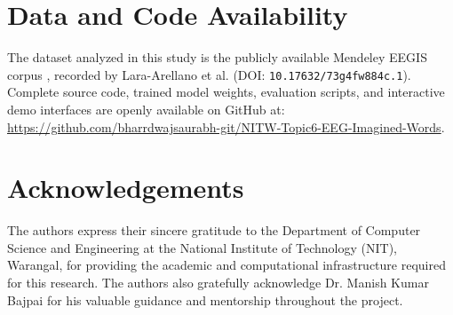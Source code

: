 \documentclass[10pt,twocolumn,a4paper]{article}
\begin{document}
\section*{Data and Code Availability}
The dataset analyzed in this study is the publicly available Mendeley EEGIS corpus \cite{mendeley_eegis_2025}, recorded by Lara-Arellano et al. (DOI: \texttt{10.17632/73g4fw884c.1}). Complete source code, trained model weights, evaluation scripts, and interactive demo interfaces are openly available on GitHub at: \\
\url{https://github.com/bharrdwajsaurabh-git/NITW-Topic6-EEG-Imagined-Words}.

\section*{Acknowledgements}
The authors express their sincere gratitude to the Department of Computer Science and Engineering at the National Institute of Technology (NIT), Warangal, for providing the academic and computational infrastructure required for this research. The authors also gratefully acknowledge Dr. Manish Kumar Bajpai for his valuable guidance and mentorship throughout the project.



\end{document}

